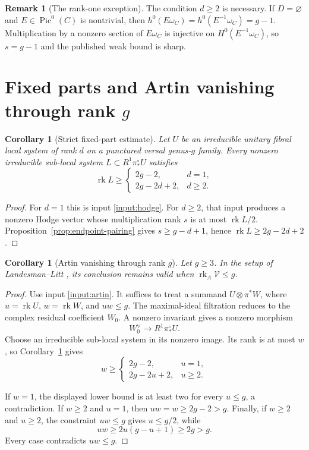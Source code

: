 \documentclass[11pt]{article}
\newtheorem{corollary}[theorem]{Corollary}
\theoremstyle{definition}
\newtheorem{remark}[theorem]{Remark}
\newcommand{\Vcal}{\mathcal V}
\newcommand{\rk}{\operatorname{rk}}
\begin{document}
\begin{remark}[The rank-one exception]
The condition $d\ge2$ is necessary.  If $D=\varnothing$ and
$E\in\operatorname{Pic}^0(C)$ is nontrivial, then
$h^0(E\omega_C)=h^0(E^{-1}\omega_C)=g-1$.  Multiplication by a nonzero
section of $E\omega_C$ is injective on $H^0(E^{-1}\omega_C)$, so
$s=g-1$ and the published weak bound is sharp.
\end{remark}

\section{Fixed parts and Artin vanishing through rank
\texorpdfstring{$g$}{g}}

\begin{corollary}[Strict fixed-part estimate]
\label{cor:fixed-part}
Let $U$ be an irreducible unitary fibral local system of rank $d$ on a
punctured versal genus-$g$ family.  Every nonzero irreducible sub-local
system $L\subset R^1\pi_*^\circ U$ satisfies
\[
 \rk L\ge
 \begin{cases}
 2g-2,&d=1,\\
 2g-2d+2,&d\ge2.
 \end{cases}
\]
\end{corollary}

\begin{proof}
For $d=1$ this is input \ref{input:hodge}.  For $d\ge2$, that input produces
a nonzero Hodge vector whose multiplication rank $s$ is at most
$\rk L/2$.  Proposition~\ref{prop:endpoint-pairing} gives
$s\ge g-d+1$, hence $\rk L\ge2g-2d+2$.
\end{proof}

\begin{corollary}[Artin vanishing through rank $g$]
\label{cor:artin-endpoint}
Let $g\ge3$.  In the setup of Landesman--Litt
\cite[Theorem~6.2.1]{LLCan}, its conclusion remains valid when
$\rk_A\Vcal\le g$.
\end{corollary}

\begin{proof}
Use input \ref{input:artin}.  It suffices to treat a summand
$U\otimes\pi^*W$, where $u=\rk U$, $w=\rk W$, and $uw\le g$.  The
maximal-ideal filtration reduces to the complex residual coefficient
$W_0$.  A nonzero invariant gives a nonzero morphism
\[
 W_0^\vee\longrightarrow R^1\pi_*^\circ U.
\]
Choose an irreducible sub-local system in its nonzero image.  Its rank is at
most $w$, so Corollary~\ref{cor:fixed-part} gives
\[
 w\ge
 \begin{cases}
 2g-2,&u=1,\\
 2g-2u+2,&u\ge2.
 \end{cases}
\]

If $w=1$, the displayed lower bound is at least two for every $u\le g$, a
contradiction.  If $w\ge2$ and $u=1$, then
$uw=w\ge2g-2>g$.  Finally, if $w\ge2$ and $u\ge2$, the constraint $uw\le g$
gives $u\le g/2$, while
\[
 uw\ge2u(g-u+1)\ge2g>g.
\]
Every case contradicts $uw\le g$.
\end{proof}
\end{document}

